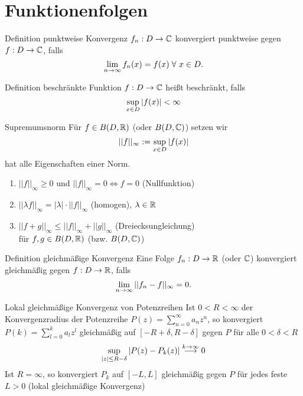 \documentclass[main.tex]{subfiles}
\begin{document}
\section*{Funktionenfolgen}
\begin{karte}{Definition punktweise Konvergenz}
    \( f_n : D \rightarrow \mathbb{C} \) konvergiert punktweise 
    gegen \( f: D \rightarrow \mathbb{C} \), falls 
    \[ \limes{n} f_n(x) = f(x) \; \forall \, x \in D. \]
\end{karte}
\begin{karte}{Definition beschränkte Funktion}
    \( f: D \rightarrow \mathbb{C} \) heißt beschränkt, falls 
    \[ \underset{x\in D}{\sup} \left| f(x) \right| < \infty \]
\end{karte}
\begin{karte}{Supremumsnorm}
    Für \( f\in B(D,\mathbb{R}) \) (oder \( B(D,\mathbb{C}) \)) setzen wir 
    \[ ||f||_\infty := \underset{x\in D}{\sup} \left| f(x) \right|\]
    hat alle Eigenschaften einer Norm.
    \begin{enumerate}
        \item \( ||f||_\infty \geq 0 \) und 
        \( ||f||_\infty = 0 \Leftrightarrow f = 0 \) 
        (Nullfunktion)
        \item \( ||\lambda f||_\infty = |\lambda| \cdot 
        ||f||_\infty \) (homogen), \( \lambda \in \mathbb{R} \)
        \item \( ||f+g||_\infty \leq ||f||_\infty 
        + ||g||_\infty \) (Dreiecksungleichung) \\
        für \( f, g \in B(D, \mathbb{R}) \) (bzw. \( B(D,\mathbb{C}) \))
    \end{enumerate}
\end{karte}
\begin{karte}{Definition gleichmäßige Konvergenz}
    Eine Folge \( f_n : D \rightarrow \mathbb{R} \) (oder \( \mathbb{C} \)) 
    konvergiert gleichmäßig gegen \( f: D \rightarrow \mathbb{R} \), 
    falls 
    \[ \lim\limits_{n\rightarrow\infty} ||f_n - f ||_\infty = 0. \]
\end{karte}
\begin{karte}{Lokal gleichmäßige Konvergenz von Potenzreihen}
    Ist \(0 < R < \infty \) der Konvergenzradius der Potenzreihe 
    \(P(z) = \sum_{n=0}^{\infty} a_n z^n \), so konvergiert
    \(P(k) = \sum_{l=0}^{k} a_l z^l \) gleichmäßig auf
    \([-R + \delta, R - \delta] \) gegen \( P \) für alle 
    \( 0 < \delta < R \)
    \[ \underset{\left| z \right| \leq R-\delta}{\sup} \left| P(z)-P_k(z) \right|
    \overset{k \rightarrow \infty}{\longrightarrow} 0 \]
    Ist \( R = \infty \), so konvergiert \( P_k \) auf 
    \( [-L,L] \) gleichmäßig gegen \( P \) für jedes feste
    \( L > 0 \) (lokal gleichmäßige Konvergenz)
\end{karte}
\end{document}
